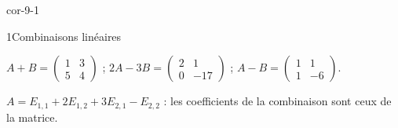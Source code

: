 
\corrigesSouples

\begin{blocLivre}{cor-9-1}
\begin{corrige}{1}{Combinaisons linéaires}
\begin{questions}
  \item $A+B=\begin{pmatrix}1&3\\5&4\end{pmatrix}$ ;\quad
    $2A-3B=\begin{pmatrix}2&1\\0&-17\end{pmatrix}$ ;\quad
    $A-B=\begin{pmatrix}1&1\\1&-6\end{pmatrix}$.
  \item $A=E_{1,1}+2E_{1,2}+3E_{2,1}-E_{2,2}$ : les coefficients de la
    combinaison sont ceux de la matrice.
\end{questions}
\end{corrige}
\end{blocLivre}


